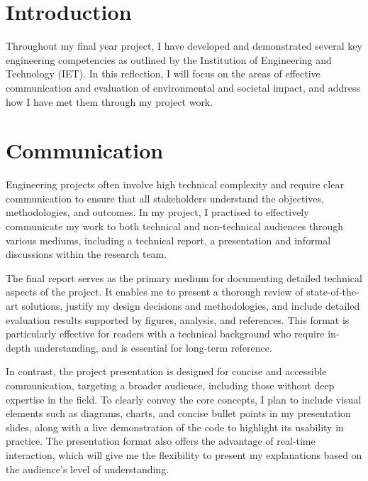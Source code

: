 \section*{Introduction}

Throughout my final year project, I have developed and demonstrated several key engineering competencies as outlined by the Institution of Engineering and Technology (IET). In this reflection, I will focus on the areas of effective communication and evaluation of environmental and societal impact, and address how I have met them through my project work. 


%

\section{Communication}

Engineering projects often involve high technical complexity and require clear communication to ensure that all stakeholders understand the objectives, methodologies, and outcomes. In my project, I practised to effectively communicate my work to both technical and non-technical audiences through various mediums, including a technical report, a presentation and informal discussions within the research team. 

The final report serves as the primary medium for documenting detailed technical aspects of the project. It enables me to present a thorough review of state-of-the-art solutions, justify my design decisions and methodologies, and include detailed evaluation results supported by figures, analysis, and references. This format is particularly effective for readers with a technical background who require in-depth understanding, and is essential for long-term reference. 

In contrast, the project presentation is designed for concise and accessible communication, targeting a broader audience, including those without deep expertise in the field. To clearly convey the core concepts, I plan to include visual elements such as diagrams, charts, and concise bullet points in my presentation slides, along with a live demonstration of the code to highlight its usability in practice. The presentation format also offers the advantage of real-time interaction, which will give me the flexibility to present my explanations based on the audience's level of understanding. 

